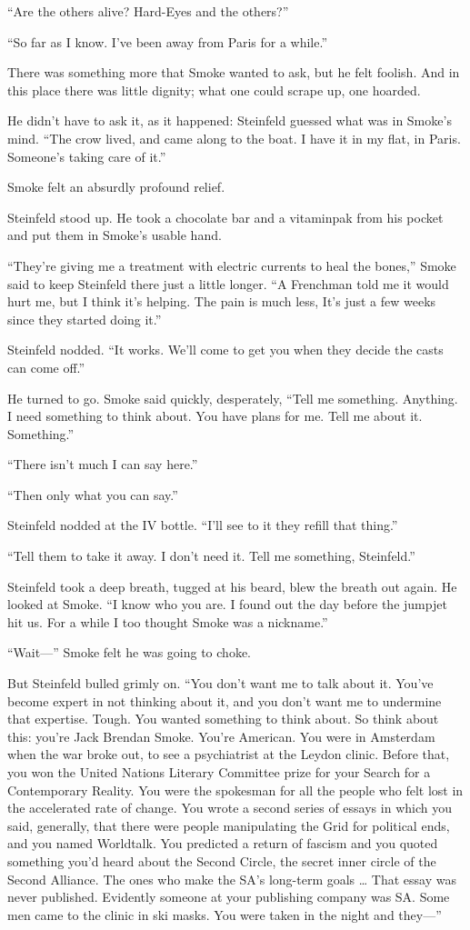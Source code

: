 “Are the others alive? Hard-Eyes and the others?”

“So far as I know. I’ve been away from Paris for a while.”

There was something more that Smoke wanted to ask, but he felt foolish. And in this place there was little dignity; what one could scrape up, one hoarded.

He didn’t have to ask it, as it happened: Steinfeld guessed what was in Smoke’s mind. “The crow lived, and came along to the boat. I have it in my flat, in Paris. Someone’s taking care of it.”

Smoke felt an absurdly profound relief.

Steinfeld stood up. He took a chocolate bar and a vitaminpak from his pocket and put them in Smoke’s usable hand.

“They’re giving me a treatment with electric currents to heal the bones,” Smoke said to keep Steinfeld there just a little longer. “A Frenchman told me it would hurt me, but I think it’s helping. The pain is much less, It’s just a few weeks since they started doing it.”

Steinfeld nodded. “It works. We’ll come to get you when they decide the casts can come off.”

He turned to go. Smoke said quickly, desperately, “Tell me something. Anything. I need something to think about. You have plans for me. Tell me about it. Something.”

“There isn’t much I can say here.”

“Then only what you can say.”

Steinfeld nodded at the IV bottle. “I’ll see to it they refill that thing.”

“Tell them to take it away. I don’t need it. Tell me something, Steinfeld.”

Steinfeld took a deep breath, tugged at his beard, blew the breath out again. He looked at Smoke. “I know who you are. I found out the day before the jumpjet hit us. For a while I too thought Smoke was a nickname.”

“Wait—” Smoke felt he was going to choke.

But Steinfeld bulled grimly on. “You don’t want me to talk about it. You’ve become expert in not thinking about it, and you don’t want me to undermine that expertise. Tough. You wanted something to think about. So think about this: you’re Jack Brendan Smoke. You’re American. You were in Amsterdam when the war broke out, to see a psychiatrist at the Leydon clinic. Before that, you won the United Nations Literary Committee prize for your Search for a Contemporary Reality. You were the spokesman for all the people who felt lost in the accelerated rate of change. You wrote a second series of essays in which you said, generally, that there were people manipulating the Grid for political ends, and you named Worldtalk. You predicted a return of fascism and you quoted something you’d heard about the Second Circle, the secret inner circle of the Second Alliance. The ones who make the SA’s long-term goals … That essay was never published. Evidently someone at your publishing company was SA. Some men came to the clinic in ski masks. You were taken in the night and they—”


